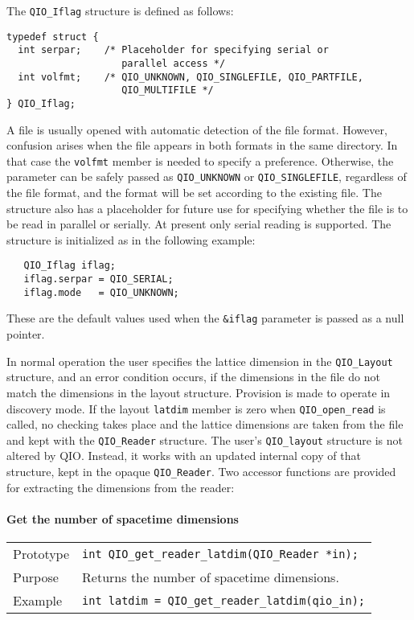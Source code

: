 \documentclass{article}
\begin{document}
The \verb|QIO_Iflag| structure is defined as follows:
%
%
\begin{verbatim}
typedef struct {
  int serpar;    /* Placeholder for specifying serial or 
                    parallel access */
  int volfmt;    /* QIO_UNKNOWN, QIO_SINGLEFILE, QIO_PARTFILE, 
                    QIO_MULTIFILE */
} QIO_Iflag;
\end{verbatim}
%

A file is usually opened with automatic detection of the file format.
However, confusion arises when the file appears in both formats in the
same directory.  In that case the \verb|volfmt| member is needed to
specify a preference.  Otherwise, the parameter can be safely passed
as \verb|QIO_UNKNOWN| or \verb|QIO_SINGLEFILE|, regardless of the file
format, and the format will be set according to the existing file.
The structure also has a placeholder for future use for specifying
whether the file is to be read in parallel or serially.  At present
only serial reading is supported.  The structure is initialized as in
the following example:

%
\begin{verbatim}
   QIO_Iflag iflag;
   iflag.serpar = QIO_SERIAL;
   iflag.mode   = QIO_UNKNOWN;
\end{verbatim}
%
These are the default values used when the \verb|&iflag| parameter is
passed as a null pointer.


In normal operation the user specifies the lattice dimension in the
\verb|QIO_Layout| structure, and an error condition occurs, if the
dimensions in the file do not match the dimensions in the layout
structure.  Provision is made to operate in discovery mode.  If the
layout \verb|latdim| member is zero when \verb|QIO_open_read| is
called, no checking takes place and the lattice dimensions are taken
from the file and kept with the \verb|QIO_Reader| structure.  The
user's \verb|QIO_layout| structure is not altered by QIO\@.  Instead,
it works with an updated internal copy of that structure, kept in the
opaque \verb|QIO_Reader|.  Two accessor functions are provided for
extracting the dimensions from the reader:

\paragraph{Get the number of spacetime dimensions}

\begin{flushleft}
  \begin{tabular}{|l|l|}
  \hline
  Prototype      & \verb|int QIO_get_reader_latdim(QIO_Reader *in);| \\
  Purpose        & Returns the number of spacetime dimensions. \\
\hline
  Example  & \verb|int latdim = QIO_get_reader_latdim(qio_in);|\\
   \hline
 \end{tabular}
\end{flushleft}
%
\end{document}
